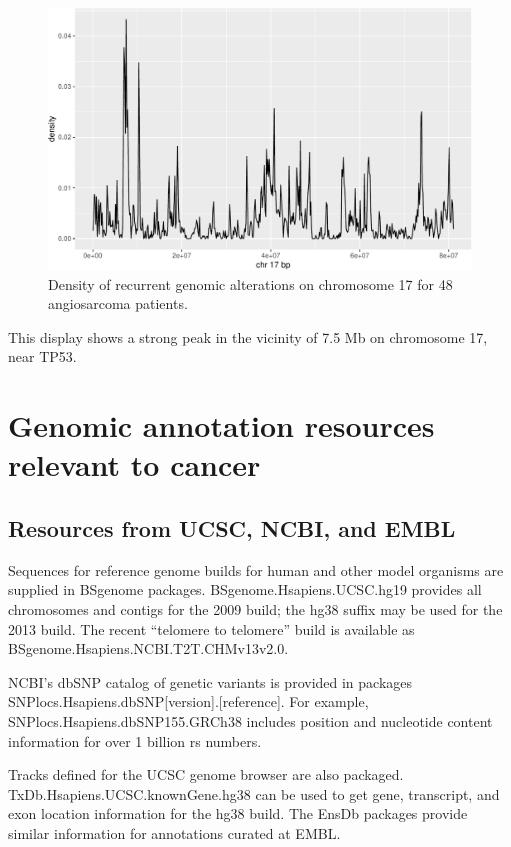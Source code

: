 \begin{figure}
\includegraphics[width=1\linewidth,]{bioccb_files/figure-latex/mkden-1} \caption{Density of recurrent genomic alterations on chromosome 17 for 48 angiosarcoma patients.}\label{fig:mkden}
\end{figure}

This display shows a strong peak in the vicinity of 7.5 Mb on chromosome 17, near TP53.

\hypertarget{hubs}{%
\section{Genomic annotation resources relevant to cancer}\label{hubs}}

\hypertarget{resources-from-ucsc-ncbi-and-embl}{%
\subsection{Resources from UCSC, NCBI, and EMBL}\label{resources-from-ucsc-ncbi-and-embl}}

Sequences for reference genome builds for human and
other model organisms are supplied in BSgenome packages.
BSgenome.Hsapiens.UCSC.hg19 provides all chromosomes and
contigs for the 2009 build; the hg38 suffix may be used
for the 2013 build. The recent ``telomere to telomere''
build is available as BSgenome.Hsapiens.NCBI.T2T.CHMv13v2.0.

NCBI's dbSNP catalog of genetic variants is provided
in packages SNPlocs.Hsapiens.dbSNP{[}version{]}.{[}reference{]}.
For example, SNPlocs.Hsapiens.dbSNP155.GRCh38 includes
position and nucleotide content information for over
1 billion rs numbers.

Tracks defined for the UCSC genome browser are also
packaged. TxDb.Hsapiens.UCSC.knownGene.hg38 can be
used to get gene, transcript, and exon location information
for the hg38 build. The EnsDb packages provide similar
information for annotations curated at EMBL.

